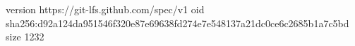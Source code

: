 version https://git-lfs.github.com/spec/v1
oid sha256:d92a124da951546f320e87e69638fd274e7e548137a21dc0ce6c2685b1a7c5bd
size 1232
